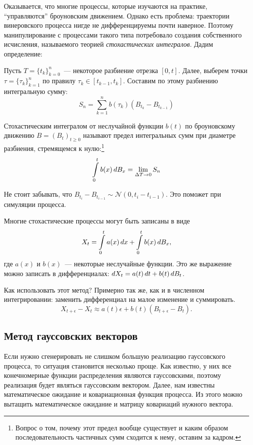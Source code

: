 Оказывается, что многие процессы, которые изучаются на практике, 
``управляются'' броуновским движением. Однако есть проблема: траектории 
винеровского процесса нигде не дифференцируемы почти наверное. Поэтому 
манипулирование с процессами такого типа потребовало создания собственного 
исчисления, называемого теорией \emph{стохастических интегралов}. Дадим 
определение:
\begin{definition}
	Пусть \(T = \{t_{k}\}_{k = 0}^{n}\)~--- некоторое 
	разбиение отрезка \([0, t]\). Далее, выберем точки \(\tau = \{\tau_{k}\}_{k 
	= 1}^{n}\) по правилу \(\tau_{k} \in [t_{k - 1}, t_{k}]\). Составим по 
	этому разбиению интегральную сумму:
	\[
		S_{n} = \sum_{k = 1}^{n} b(\tau_{k})(B_{t_{k}} - B_{t_{k - 1}})
	\]
	
	Стохастическим интегралом от неслучайной функции \(b(t)\) по броуновскому 
	движению \(B = (B_t)_{t \geq 0}\) называют предел интегральных сумм при 
	диаметре разбиения, стремящемся к нулю:\footnote{Вопрос о том, почему этот 
	предел вообще существует и каким образом последовательность частичных сумм 
	сходится к нему, оставим за кадром.}
	\[
		\int\limits_{0}^{t} b(x)\mathop{}\!d B_{x} = \lim_{\Delta T \to 0} S_{n}
	\]
\end{definition}
\begin{remark}
	Не стоит забывать, что \(B_{t_i} - B_{t_{i-1}} \sim \mathcal{N}(0, t_{i} - 
	t_{i - 1})\). Это поможет при симуляции процесса.
\end{remark} 

Многие стохастические процессы могут быть записаны в виде 
\[
	X_{t} = \int\limits_{0}^{t} a(x)\mathop{}\!d x + \int\limits_{0}^{t} b(x)\mathop{}\!d 
	B_{x},
\]
где \(a(x)\) и \(b(x)\)~--- некоторые неслучайные функции. Это же выражение 
можно записать в дифференциалах: \(\mathop{}\!d X_{t} = a(t)\mathop{}\!d t + b(t)\mathop{}\!d 
B_{t}\).

Как использовать этот метод? Примерно так же, как и в численном интегрировании: 
заменить дифференциал на малое изменение и суммировать.
\[
	X_{t + \epsilon} - X_{t} \approx a(t)\epsilon + b(t)(B_{t + \epsilon} - 
	B_{t}).
\]

\subsection{Метод гауссовских векторов}
Если нужно сгенерировать не слишком большую реализацию гауссовского процесса, 
то ситуация становится несколько проще. Как известно, у них все конечномерные 
функции распределения являются гауссовскими, поэтому реализация будет являться 
гауссовским вектором. Далее, нам известны математическое ожидание и 
ковариационная функция процесса. Из этого можно вытащить математическое 
ожидание и матрицу ковариаций нужного вектора.

